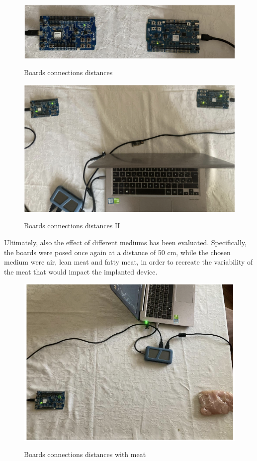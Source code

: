 \documentclass{Configuration_Files/PoliMi3i_thesis}
\begin{document}
\begin{figure}[H]
    \centering
    \includegraphics[scale=0.6]{Test_Procedure/20.png}
    \label{direct_communication_board_PC_20}
    \caption{Boards connections distances}
\end{figure}

\begin{figure}[H]
    \centering
    \includegraphics[scale=0.6]{Test_Procedure/21.png}
    \label{direct_communication_board_PC_21}
    \caption{Boards connections distances II}
\end{figure}

Ultimately, also the effect of different mediums has been evaluated. Specifically, the boards were posed once again at a distance of 50 cm, while the chosen medium were air, lean meat and fatty meat, in order to recreate the variability of the meat that would impact the implanted device.

\begin{figure}[H]
    \centering
    \includegraphics[scale=0.6]{Test_Procedure/22.png}
    \label{direct_communication_board_PC_22}
    \caption{Boards connections distances with meat}
\end{figure}
\end{document}
